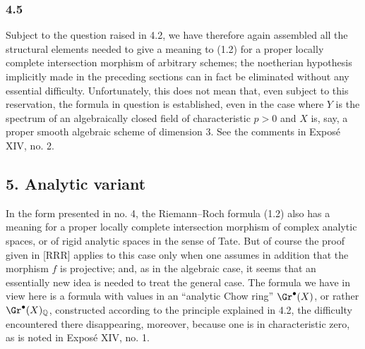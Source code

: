 \subsubsection*{4.5}
Subject to the question raised in 4.2, we have therefore again assembled all the structural elements needed to give a meaning to (1.2) for a proper locally complete intersection morphism of arbitrary schemes; the noetherian hypothesis implicitly made in the preceding sections can in fact be eliminated without any essential difficulty. Unfortunately, this does not mean that, even subject to this reservation, the formula in question is established, even in the case where $Y$ is the spectrum of an algebraically closed field of characteristic $p>0$ and $X$ is, say, a proper smooth algebraic scheme of dimension $3$. See the comments in Expos\'e XIV, no. 2.

\subsection*{5. Analytic variant}
In the form presented in no. 4, the Riemann--Roch formula (1.2) also has a meaning for a proper locally complete intersection morphism of complex analytic spaces, or of rigid analytic spaces in the sense of Tate. But of course the proof given in [RRR] applies to this case only when one assumes in addition that the morphism $f$ is projective; and, as in the algebraic case, it seems that an essentially new idea is needed to treat the general case. The formula we have in view here is a formula with values in an ``analytic Chow ring'' $\Gr^\bullet(X)$, or rather $\Gr^\bullet(X)_{\mathbb Q}$, constructed according to the principle explained in 4.2, the difficulty encountered there disappearing, moreover, because one is in characteristic zero, as is noted in Expos\'e XIV, no. 1.

